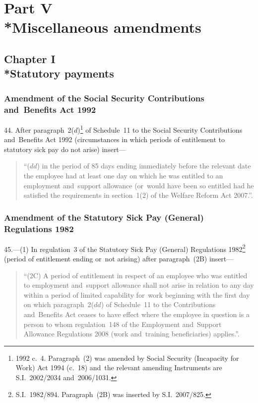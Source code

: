\documentclass[12pt,a4paper]{article}
\begin{document}
\section[Part V --- Miscellaneous amendments]{Part V\\*Miscellaneous amendments}

\subsection[Chapter I --- Statutory payments]{Chapter I\\*Statutory payments}

\renewcommand\parthead{--- Part V Chapter I}

\subsubsection[44. Amendment of the Social Security Contributions and~Benefits Act 1992]{Amendment of the Social Security Contributions and~Benefits Act 1992}

44.  After paragraph~2($d$)\footnote{1992 c.~4. Paragraph~(2) was amended by Social Security (Incapacity for Work) Act 1994 (c.~18) and~the relevant amending Instruments are S.I.~2002/2034 and~2006/1031.} of Schedule~11 to the Social Security Contributions and~Benefits Act 1992 (circumstances in which periods of entitlement to statutory sick pay do not arise) insert—
\begin{quotation}
“($dd$) in the period of 85 days ending immediately before the relevant date the employee had at least one day on which he was entitled to an employment and~support allowance (or~would have been so entitled had he satisfied the requirements in section~1(2) of the Welfare Reform Act 2007.”.
\end{quotation}

\subsubsection[45. Amendment of the Statutory Sick Pay (General) Regulations 1982]{Amendment of the Statutory Sick Pay (General) Regulations 1982}

45.---(1)  In regulation~3 of the Statutory Sick Pay (General) Regulations 1982\footnote{S.I.~1982/894. Paragraph~(2B) was inserted by S.I.~2007/825.} (period of entitlement ending or~not arising) after paragraph~(2B) insert—
\begin{quotation}
“(2C) A period of entitlement in respect of an employee who was entitled to employment and~support allowance shall not arise in relation to any day within a period of limited capability for~work beginning with the first day on which paragraph~2($dd$)  of Schedule~11 to the Contributions and~Benefits Act ceases to have effect where the employee in question is a person to whom regulation~148 of the Employment and~Support Allowance Regulations 2008 (work and~training beneficiaries) applies.”.
\end{quotation}
\end{document}
